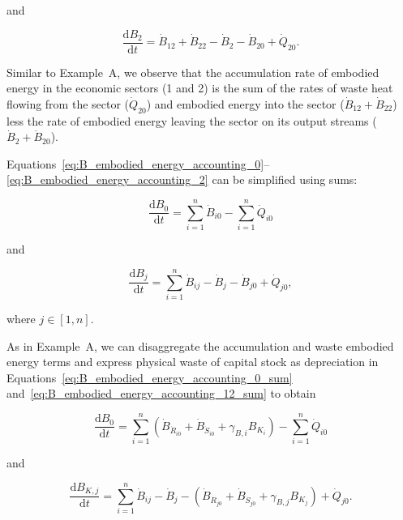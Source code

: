 \noindent and

\begin{equation} \label{eq:B_embodied_energy_accounting_2}
	\frac{\mathrm{d}B_2}{\mathrm{d}t} 
	= \dot{B}_{12} 
	+ \dot{B}_{22} 
	- \dot{B}_{2}
	- \dot{B}_{20} 
	+ \dot{Q}_{20}.
\end{equation}

Similar to Example~A, we observe that the accumulation rate 
of embodied energy in the economic sectors (1 and 2) 
is the sum of the rates of waste heat flowing from the sector 
($\dot{Q}_{20}$) and embodied energy into the sector 
($\dot{B}_{12} + \dot{B}_{22}$) 
less the rate of embodied energy leaving the sector 
on its output streams ($\dot{B}_{2} + \dot{B}_{20}$).

Equations~\ref{eq:B_embodied_energy_accounting_0}--\ref{eq:B_embodied_energy_accounting_2}
can be simplified using sums:

\begin{equation} \label{eq:B_embodied_energy_accounting_0_sum}
	\frac{\mathrm{d}B_{0}}{\mathrm{d}t} 
	= \sum\limits_{i=1}^n\dot{B}_{i0} 
	- \sum\limits_{i=1}^n\dot{Q}_{i0} 
\end{equation}

\noindent and

\begin{equation} \label{eq:B_embodied_energy_accounting_12_sum}
	\frac{\mathrm{d}B_{j}}{\mathrm{d}t} 
	= \sum\limits_{i=1}^n\dot{B}_{ij} 
	- \dot{B}_{j}
	- \dot{B}_{j0} 
	+ \dot{Q}_{j0},
\end{equation}

\noindent where $j \in [1, n]$.

As in Example~A, 
we can disaggregate the accumulation and waste embodied energy terms 
and express physical waste of capital stock as depreciation 
in Equations~\ref{eq:B_embodied_energy_accounting_0_sum}
and~\ref{eq:B_embodied_energy_accounting_12_sum}
to obtain

\begin{equation} \label{eq:B_embodied_energy_accounting_0_with_depreciation}
	\frac{\mathrm{d}B_{0}}{\mathrm{d}t} 
	= \sum\limits_{i=1}^n 
		\left( \dot{B}_{\dot{R}_{i0}} 
				+ \dot{B}_{\dot{S}_{i0}} 
				+ \gamma_{B,i} B_{K_{i}} \right)
	- \sum\limits_{i=1}^n\dot{Q}_{i0} 
\end{equation}

\noindent and

\begin{equation} \label{eq:B_embodied_energy_accounting_12_with_depreciation}
	\frac{\mathrm{d}B_{K,j}}{\mathrm{d}t} 
	= \sum\limits_{i=1}^n\dot{B}_{ij} 
	- \dot{B}_{j}
	- \left( \dot{B}_{\dot{R}_{j0}}
		+ \dot{B}_{\dot{S}_{j0}}
		+ \gamma_{B,j} B_{K_{j}} \right)
	+ \dot{Q}_{j0}.
\end{equation}

